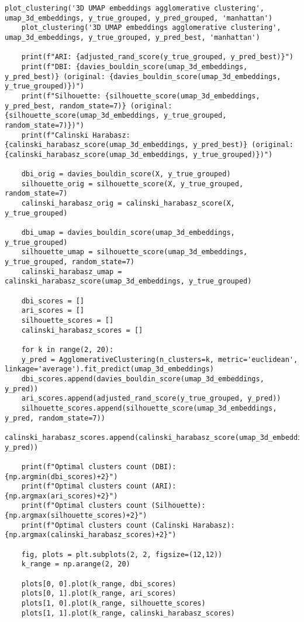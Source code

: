 \begin{lstlisting}[label=lst:1,caption=Кластеризация респондентов социологического исследования]
	plot_clustering('3D UMAP embeddings agglomerative clustering', umap_3d_embeddings, y_true_grouped, y_pred_grouped, 'manhattan')
	plot_clustering('3D UMAP embeddings agglomerative clustering', umap_3d_embeddings, y_true_grouped, y_pred_best, 'manhattan')
	
	print(f"ARI: {adjusted_rand_score(y_true_grouped, y_pred_best)}")
	print(f"DBI: {davies_bouldin_score(umap_3d_embeddings, y_pred_best)} (original: {davies_bouldin_score(umap_3d_embeddings, y_true_grouped)})")
	print(f"Silhouette: {silhouette_score(umap_3d_embeddings, y_pred_best, random_state=7)} (original: {silhouette_score(umap_3d_embeddings, y_true_grouped, random_state=7)})")
	print(f"Calinski Harabasz: {calinski_harabasz_score(umap_3d_embeddings, y_pred_best)} (original: {calinski_harabasz_score(umap_3d_embeddings, y_true_grouped)})")
	
	dbi_orig = davies_bouldin_score(X, y_true_grouped)
	silhouette_orig = silhouette_score(X, y_true_grouped, random_state=7)
	calinski_harabasz_orig = calinski_harabasz_score(X, y_true_grouped)
	
	dbi_umap = davies_bouldin_score(umap_3d_embeddings, y_true_grouped)
	silhouette_umap = silhouette_score(umap_3d_embeddings, y_true_grouped, random_state=7)
	calinski_harabasz_umap = calinski_harabasz_score(umap_3d_embeddings, y_true_grouped)
	
	dbi_scores = []
	ari_scores = []
	silhouette_scores = []
	calinski_harabasz_scores = []
	
	for k in range(2, 20):
	y_pred = AgglomerativeClustering(n_clusters=k, metric='euclidean', linkage='average').fit_predict(umap_3d_embeddings)
	dbi_scores.append(davies_bouldin_score(umap_3d_embeddings, y_pred))
	ari_scores.append(adjusted_rand_score(y_true_grouped, y_pred))
	silhouette_scores.append(silhouette_score(umap_3d_embeddings, y_pred, random_state=7))
	calinski_harabasz_scores.append(calinski_harabasz_score(umap_3d_embeddings, y_pred))
	
	print(f"Optimal clusters count (DBI):               {np.argmin(dbi_scores)+2}")
	print(f"Optimal clusters count (ARI):               {np.argmax(ari_scores)+2}")
	print(f"Optimal clusters count (Silhouette):        {np.argmax(silhouette_scores)+2}")
	print(f"Optimal clusters count (Calinski Harabasz): {np.argmax(calinski_harabasz_scores)+2}")
	
	fig, plots = plt.subplots(2, 2, figsize=(12,12))
	k_range = np.arange(2, 20)
	
	plots[0, 0].plot(k_range, dbi_scores)
	plots[0, 1].plot(k_range, ari_scores)
	plots[1, 0].plot(k_range, silhouette_scores)
	plots[1, 1].plot(k_range, calinski_harabasz_scores)
	

\end{lstlisting}
